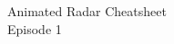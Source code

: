 \documentclass[preview]{standalone}
\begin{document}
\begin{center}
Animated Radar Cheatsheet\\Episode 1
\end{center}
\end{document}
